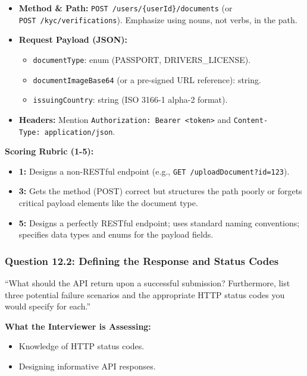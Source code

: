 \documentclass[
  11pt,
  openany,
  oneside]{book}
\providecommand{\tightlist}{%
  \setlength{\itemsep}{0pt}\setlength{\parskip}{0pt}}
\begin{document}
\begin{itemize}
\tightlist
\item
  \textbf{Method \& Path:} \texttt{POST\ /users/\{userId\}/documents}
  (or \texttt{POST\ /kyc/verifications}). Emphasize using nouns, not
  verbs, in the path.
\item
  \textbf{Request Payload (JSON):}

  \begin{itemize}
  \tightlist
  \item
    \texttt{documentType}: enum (PASSPORT, DRIVERS\_LICENSE).
  \item
    \texttt{documentImageBase64} (or a pre-signed URL reference):
    string.
  \item
    \texttt{issuingCountry}: string (ISO 3166-1 alpha-2 format).
  \end{itemize}
\item
  \textbf{Headers:} Mention
  \texttt{Authorization:\ Bearer\ \textless{}token\textgreater{}} and
  \texttt{Content-Type:\ application/json}.
\end{itemize}

\textbf{Scoring Rubric (1-5):}

\begin{itemize}
\tightlist
\item
  \textbf{1:} Designs a non-RESTful endpoint (e.g.,
  \texttt{GET\ /uploadDocument?id=123}).
\item
  \textbf{3:} Gets the method (POST) correct but structures the path
  poorly or forgets critical payload elements like the document type.
\item
  \textbf{5:} Designs a perfectly RESTful endpoint; uses standard naming
  conventions; specifies data types and enums for the payload fields.
\end{itemize}

\subsubsection{Question 12.2: Defining the Response and Status
Codes}\label{question-12.2-defining-the-response-and-status-codes}

``What should the API return upon a successful submission? Furthermore,
list three potential failure scenarios and the appropriate HTTP status
codes you would specify for each.''

\textbf{What the Interviewer is Assessing:}

\begin{itemize}
\tightlist
\item
  Knowledge of HTTP status codes.
\item
  Designing informative API responses.
\end{itemize}
\end{document}
